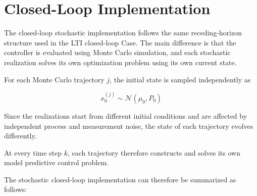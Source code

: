 \section{Closed-Loop Implementation}
\label{sec:stochastic_closed_loop}

The closed-loop stochastic implementation follows the same receding-horizon structure used in the LTI closed-loop Case. The main difference is that the controller is evaluated using Monte Carlo simulation, and each stochastic realization solves its own optimization problem using its own current state.

For each Monte Carlo trajectory \(j\), the initial state is sampled independently as

\begin{equation}
    x_0^{(j)}
    \sim
    \mathcal{N}(\mu_0,P_0)
\end{equation}

Since the realizations start from different initial conditions and are affected by independent process and measurement noise, the state of each trajectory evolves differently.

At every time step \(k\), each trajectory therefore constructs and solves its own model predictive control problem.


The stochastic closed-loop implementation can therefore be summarized as follows:

